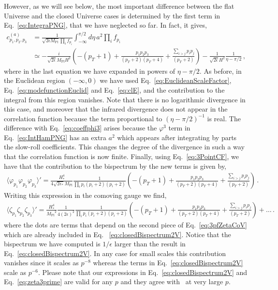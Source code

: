 \documentclass[a4paper,11pt]{article}
\numberwithin{equation}{section}
\newcommand{\mpl}{{M_{\mathrm{Pl}}}}
\numberwithin{equation}{section}
\begin{document}
However, as we will see below, the most important difference between the flat Universe and the closed Universe cases is determined by the first term in Eq.~\eqref{eq:IntegraPNG}, that we have neglected so far. In fact, it gives,
\begin{align}
c^{(a)}_{p_1,p_2,p_3}&=\frac{1}{\sqrt{2\epsilon\mpl} \prod_i f_{p_i}}\int^{\pi/2}_{-\infty} d\eta \, a^2\prod_i f_{p_i}\label{eq:ca}\\
&\simeq-\frac{i}{\sqrt{2\epsilon}\mpl H^2}\left(-(p_T+1)+\frac{p_1p_2 p_3}{(p_T+2)(p_T+4)} + \frac{\sum_{i>j} p_i p_j}{(p_T+2)}\right) - \frac{1}{\sqrt{2\epsilon} H^2}\frac{1}{\eta-\pi/2} \,, \nonumber
\end{align}
where in the last equation we have expanded in powers of $\eta-\pi/2$. As before, in the Euclidean region $(-\infty, 0)$ we have used Eq.~\eqref{eq:EuclideanScaleFactor}, Eq.~\eqref{eq:modefunctionEuclid} and Eq.~\eqref{eq:clE}, and the contribution to the integral from this region vanishes.
Note that there is no logarithmic divergence in this case, and moreover that the infrared divergence does not appear in the correlation function because the term proportional to $(\eta - \pi/2)^{-1}$ is real. The difference with Eq.~\eqref{eq:coeffphi3} arises because the $\varphi^3$ term in Eq.~\eqref{eq:IntHamPNG} has an extra $a^2$ which appears after integrating by parts the slow-roll coefficients. This changes the degree of the divergence in such a way that the correlation function is now finite. 
Finally, using Eq.~\eqref{eq:3PointCF}, we have that the contribution to the bispectrum by the new terms is given by, 
\begin{align}
\langle \varphi_{p_1}\varphi_{p_2}\varphi_{p_3}\rangle'=\frac{H_*^4}{4\sqrt{2\epsilon_*}\mpl}\frac{1}{\prod_{i}p_i(p_i+2)(p_i+2)}\left(-(p_T+1)+\frac{p_1p_2p_3}{(p_T+2)(p_T+4)}+\frac{\sum_{i>j}p_i p_j}{(p_T+2)}\right) \,.
\label{PNG}
\end{align}
Writing this expression in the comoving gauge we find, 
\begin{align}
\langle \zeta_{p_1}\zeta_{p_2}\zeta_{p_3}\rangle'=\frac{H_*^4}{\mpl^2}\frac{1}{4(2\epsilon)^2}\frac{1}{\prod_{i}p_i(p_i+2)(p_i+2)}\left(-(p_T+1)+\frac{p_1 p_2 p_3}{(p_T+2)(p_T+4)}+\frac{\sum_{i>j}p_i p_j}{(p_T+2)}\right) +\dots\,.
\label{eq:zeta3prime}
\end{align}
where the dots are terms that depend on the second piece of Eq.~\eqref{eq:3pfZetaCoV} which are already included in Eq.~ \eqref{eq:closedBispectrum2V}.
Notice that the bispectrum  we have  computed is $1/\epsilon$ larger than the result in Eq.~\eqref{eq:closedBispectrum2V}. In any case for small scales this contribution vanishes since it  scales as $p^{-8}$ whereas the terms in Eq.~\eqref{eq:closedBispectrum2V} scale as $p^{-6}$. Please note that our expressions in Eq.~\eqref{eq:closedBispectrum2V} and Eq.~\eqref{eq:zeta3prime} are valid for any $p$ and they agree with~\cite{Seery:2010kh} at very large $p$.
\end{document}
